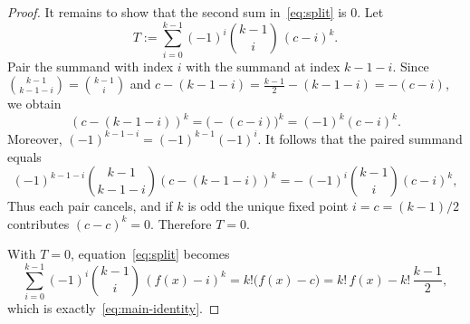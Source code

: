 \documentclass[12pt,reqno]{amsart}
\theoremstyle{plain}
\theoremstyle{definition}
\newcommand{\1}{\mathbf{1}}
\begin{document}
\begin{proof}
It remains to show that the second sum in~\eqref{eq:split} is $0$. Let
\[
T:=\sum_{i=0}^{k-1}(-1)^{i}\binom{k-1}{i}\,(c-i)^k.
\]
Pair the summand with index $i$ with the summand at index $k-1-i$. Since
$\binom{k-1}{k-1-i}=\binom{k-1}{i}$ and $
c-(k-1-i)=\frac{k-1}{2}-(k-1-i)=-(c-i)$, we obtain
\[
(c-(k-1-i))^k = \bigl(-(c-i)\bigr)^k = (-1)^k(c-i)^k.
\]
Moreover, $(-1)^{k-1-i}=(-1)^{k-1}(-1)^i$. It follows that the paired summand equals
\[
(-1)^{k-1-i}\binom{k-1}{k-1-i}(c-(k-1-i))^k
=
-\,(-1)^i\binom{k-1}{i}(c-i)^k,
\]
Thus each pair cancels, and if $k$ is odd the
unique fixed point $i=c=(k-1)/2$ contributes $(c-c)^k=0$. Therefore $T=0$.

With $T=0$, equation~\eqref{eq:split} becomes
\[
\sum_{i=0}^{k-1}(-1)^{i}\binom{k-1}{i}\,(f(x)-i)^k
= k!\bigl(f(x)-c\bigr)
= k!\,f(x)-k!\,\frac{k-1}{2},
\]
which is exactly~\eqref{eq:main-identity}.
\end{proof}
\end{document}

